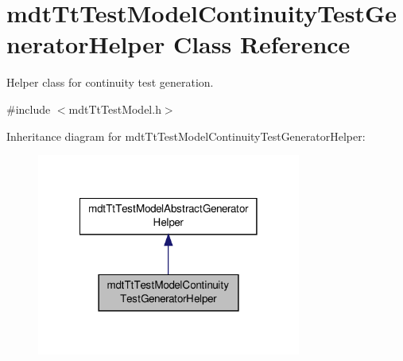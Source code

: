 \hypertarget{classmdt_tt_test_model_continuity_test_generator_helper}{\section{mdt\-Tt\-Test\-Model\-Continuity\-Test\-Generator\-Helper Class Reference}
\label{classmdt_tt_test_model_continuity_test_generator_helper}
}


Helper class for continuity test generation.  




{\ttfamily \#include $<$mdt\-Tt\-Test\-Model.\-h$>$}



Inheritance diagram for mdt\-Tt\-Test\-Model\-Continuity\-Test\-Generator\-Helper\-:
\nopagebreak
\begin{figure}[H]
\begin{center}
\leavevmode
\includegraphics[width=246pt]{classmdt_tt_test_model_continuity_test_generator_helper__inherit__graph}
\end{center}
\end{figure}


